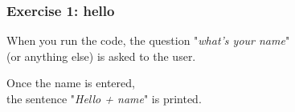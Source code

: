 
\begin{frame}[c]
\frametitle{Exercise 1: hello}

\faLaptop

When you run the code, the question "\textit{what's your name}"\\
(or anything else) is asked to the user.

Once the name is entered, \\
the sentence "\textit{Hello + name}" is printed.


\end{frame}

